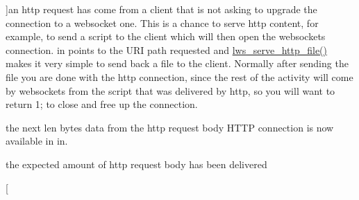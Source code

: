 \begin{Desc}
\begin{description}
{}]an http request has come from a client that is not asking to upgrade the connection to a websocket one. This is a chance to serve http content, for example, to send a script to the client which will then open the websockets connection. in points to the U\+RI path requested and \hyperlink{group__httpft_gab393a06d3d2722af4c3f8b06842c80d7}{lws\+\_\+serve\+\_\+http\+\_\+file()} makes it very simple to send back a file to the client. Normally after sending the file you are done with the http connection, since the rest of the activity will come by websockets from the script that was delivered by http, so you will want to return 1; to close and free up the connection. \item[{\em 
L\+W\+S\+\_\+\+C\+A\+L\+L\+B\+A\+C\+K\+\_\+\+H\+T\+T\+P\+\_\+\+B\+O\+DY\hypertarget{group__usercb_ggad62860e19975ba4c4af401c3cdb6abf7ac4c68e00efcf1ff7bda7ada462aff8ae}{}\label{group__usercb_ggad62860e19975ba4c4af401c3cdb6abf7ac4c68e00efcf1ff7bda7ada462aff8ae}
}]the next len bytes data from the http request body H\+T\+TP connection is now available in in. \item[{\em 
L\+W\+S\+\_\+\+C\+A\+L\+L\+B\+A\+C\+K\+\_\+\+H\+T\+T\+P\+\_\+\+B\+O\+D\+Y\+\_\+\+C\+O\+M\+P\+L\+E\+T\+I\+ON\hypertarget{group__usercb_ggad62860e19975ba4c4af401c3cdb6abf7a2fce9a8608220f32abbf1422a5498804}{}\label{group__usercb_ggad62860e19975ba4c4af401c3cdb6abf7a2fce9a8608220f32abbf1422a5498804}
}]the expected amount of http request body has been delivered \item[{\em 
}
\end{description}
\end{Desc}
